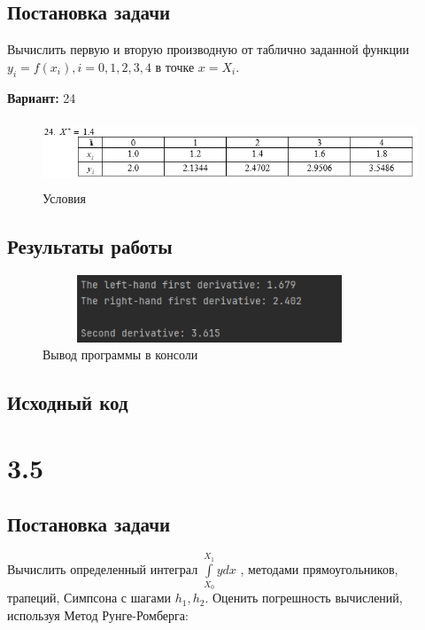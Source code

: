 \subsection{Постановка задачи}
Вычислить первую и вторую производную от таблично заданной функции $y_i=f(x_i), i=0,1,2,3,4$  в точке $x=X_i$.   

{\bfseries Вариант:} 24

\begin{figure}[h!]
\centering
\includegraphics[width=15cm, height=2cm]{img/task3_4.png}
\caption{Условия}
\end{figure}

\subsection{Результаты работы}
\begin{figure}[h!]
\centering
\includegraphics[width=10cm, height=2cm]{img/lab3_4_res.png}
\caption{Вывод программы в консоли}
\end{figure}
\pagebreak

\subsection{Исходный код}




\pagebreak
\section* {3.5}

\subsection{Постановка задачи}
Вычислить определенный интеграл $\int\limits_{X_0}^{X_1} y dx$  , методами прямоугольников, трапеций, Симпсона с шагами $h_1,h_2$. Оценить погрешность вычислений, используя  Метод Рунге-Ромберга: 

